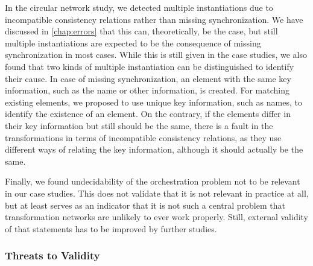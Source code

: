 In the circular network study, we detected multiple instantiations due to incompatible consistency relations rather than missing synchronization.
We have discussed in \autoref{chap:errors} that this can, theoretically, be the case, but still multiple instantiations are expected to be the consequence of missing synchronization in most cases.
While this is still given in the case studies, we also found that two kinds of multiple instantiation can be distinguished to identify their cause.
In case of missing synchronization, an element with the same key information, such as the name or other information, is created.
For matching existing elements, we proposed to use unique key information, such as names, to identify the existence of an element.
On the contrary, if the elements differ in their key information but still should be the same, there is a fault in the transformations in terms of incompatible consistency relations, as they use different ways of relating the key information, although it should actually be the same.

Finally, we found undecidability of the orchestration problem not to be relevant in our case studies.
This does not validate that it is not relevant in practice at all, but at least serves as an indicator that it is not such a central problem that transformation networks are unlikely to ever work properly.
Still, external validity of that statements has to be improved by further studies.






\subsubsection{Threats to Validity}


